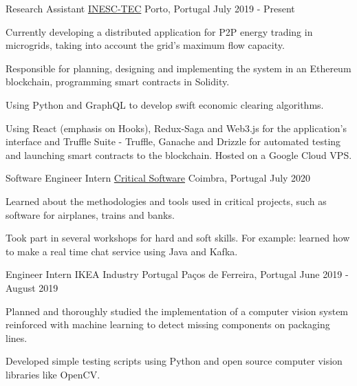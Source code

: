 
\begin{cventries}
  \cventry
    {Research Assistant} %
    {\href{https://www.inesctec.pt/en}{INESC-TEC}} %
    {Porto, Portugal} %
    {July 2019 - Present} %
    {
      \begin{cvitems} %
        \item {Currently developing a distributed application for P2P energy trading in microgrids, taking into account the grid's maximum flow capacity.}
        \item {Responsible for planning, designing and implementing the system in an Ethereum blockchain, programming smart contracts in Solidity.}
        \item {Using Python and GraphQL to develop swift economic clearing algorithms.}
        \item {Using React (emphasis on Hooks), Redux-Saga and Web3.js for the application's interface and Truffle Suite - Truffle, Ganache and Drizzle for automated testing and launching smart contracts to the blockchain. Hosted on a Google Cloud VPS.}
      \end{cvitems}
    }

  \cventry
    {Software Engineer Intern} %
    {\href{https://www.criticalsoftware.com/en}{Critical Software}} %
    {Coimbra, Portugal} %
    {July 2020} %
    {
      \begin{cvitems} %
        \item {Learned about the methodologies and tools used in critical projects, such as software for airplanes, trains and banks.}
        \item {Took part in several workshops for hard and soft skills. For example: learned how to make a real time chat service using Java and Kafka.}
      \end{cvitems}
    }

  \cventry
    {Engineer Intern} %
    {IKEA Industry Portugal} %
    {Paços de Ferreira, Portugal} %
    {June 2019 - August 2019} %
    {
      \begin{cvitems} %
        \item {Planned and thoroughly studied the implementation of a computer vision system reinforced with machine learning to detect missing components on packaging lines.}
        \item {Developed simple testing scripts using Python and open source computer vision libraries like OpenCV.}
      \end{cvitems}
    }


\end{cventries}
